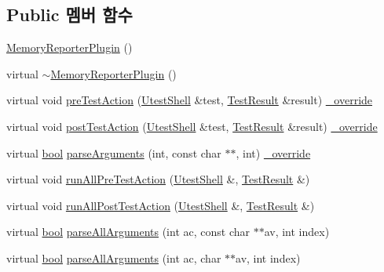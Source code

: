 \subsection*{Public 멤버 함수}
\begin{DoxyCompactItemize}
\item 
\hyperlink{class_memory_reporter_plugin_a103b323dd9992aeae16c1debee5cd00d}{Memory\+Reporter\+Plugin} ()
\item 
virtual \hyperlink{class_memory_reporter_plugin_a3aec8d3b782a55491da6c5cff0158ce5}{$\sim$\+Memory\+Reporter\+Plugin} ()
\item 
virtual void \hyperlink{class_memory_reporter_plugin_af405f9e83b5fbe382893b8dc07a8052c}{pre\+Test\+Action} (\hyperlink{class_utest_shell}{Utest\+Shell} \&test, \hyperlink{class_test_result}{Test\+Result} \&result) \hyperlink{_cpp_u_test_config_8h_a049bea15dd750e15869863c94c1efc3b}{\+\_\+override}
\item 
virtual void \hyperlink{class_memory_reporter_plugin_a488f8809f966fc52513ee74afa87cda3}{post\+Test\+Action} (\hyperlink{class_utest_shell}{Utest\+Shell} \&test, \hyperlink{class_test_result}{Test\+Result} \&result) \hyperlink{_cpp_u_test_config_8h_a049bea15dd750e15869863c94c1efc3b}{\+\_\+override}
\item 
virtual \hyperlink{avb__gptp_8h_af6a258d8f3ee5206d682d799316314b1}{bool} \hyperlink{class_memory_reporter_plugin_a52f577dfe7627722cfcbd0fca54e86e0}{parse\+Arguments} (int, const char $\ast$$\ast$, int) \hyperlink{_cpp_u_test_config_8h_a049bea15dd750e15869863c94c1efc3b}{\+\_\+override}
\item 
virtual void \hyperlink{class_test_plugin_aa3524b10b0f1613104fa75f1c1a72cf6}{run\+All\+Pre\+Test\+Action} (\hyperlink{class_utest_shell}{Utest\+Shell} \&, \hyperlink{class_test_result}{Test\+Result} \&)
\item 
virtual void \hyperlink{class_test_plugin_ac6e93f69beb5b43b8cedf17a77ccc6b1}{run\+All\+Post\+Test\+Action} (\hyperlink{class_utest_shell}{Utest\+Shell} \&, \hyperlink{class_test_result}{Test\+Result} \&)
\item 
virtual \hyperlink{avb__gptp_8h_af6a258d8f3ee5206d682d799316314b1}{bool} \hyperlink{class_test_plugin_acfa2bcea2c98a16cb7d2a8f177bb84b9}{parse\+All\+Arguments} (int ac, const char $\ast$$\ast$av, int index)
\item 
virtual \hyperlink{avb__gptp_8h_af6a258d8f3ee5206d682d799316314b1}{bool} \hyperlink{class_test_plugin_a6d3fb0408bb544bd7ec5ba9300328a5e}{parse\+All\+Arguments} (int ac, char $\ast$$\ast$av, int index)
$$
\end{DoxyCompactItemize}
